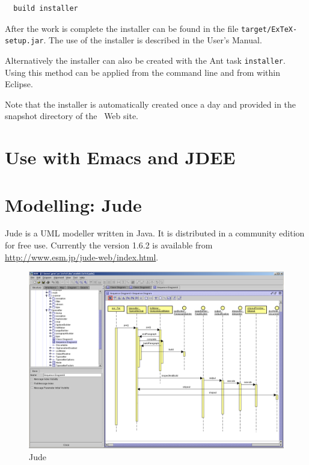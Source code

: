 \documentclass{extex-doc}
\begin{document}
\begin{verbatim}
  build installer
\end{verbatim}

After the work is complete the installer can be found in the file
\texttt{target/ExTeX-setup.jar}. The use of the installer is described
in the User's Manual.

Alternatively the installer can also be created with the Ant task
\texttt{installer}. Using this method can be applied from the command
line and from within Eclipse.

Note that the installer is automatically created once a day and
provided in the snapshot directory of the \ExTeX\ Web site.


\section{Use with Emacs and JDEE}

\INCOMPLETE



\section{Modelling: Jude}

Jude is a UML modeller written in Java. It is distributed in a
community edition for free use. Currently the version 1.6.2 is
available from \url{http://www.esm.jp/jude-web/index.html}. 
\begin{figure}[thp]
  \centering
  \includegraphics[width=\textwidth]{image/jude-seq}
  \caption{Jude}\label{fig:jude}
\end{figure}
\end{document}
